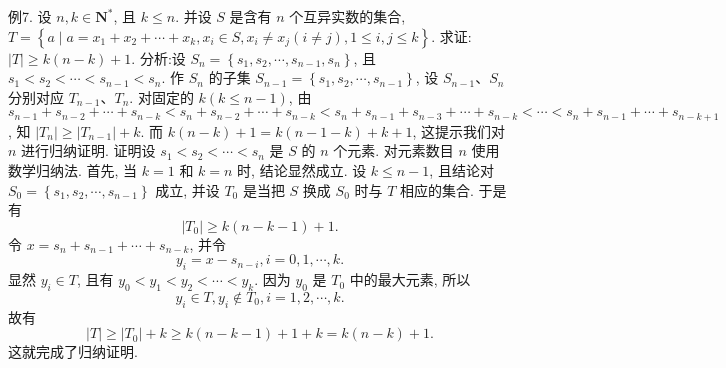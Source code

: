 例7. 设 $n, k \in \mathbf{N}^*$, 且 $k \leqslant n$. 并设 $S$ 是含有 $n$ 个互异实数的集合, $T=\left\{a \mid a=x_1+x_2+\cdots+x_k, x_i \in S, x_i \neq x_j(i \neq j), 1 \leqslant i, j \leqslant k\right\}$. 求证: $|T| \geqslant k(n-k)+1$.
分析:设 $S_n=\left\{s_1, s_2, \cdots, s_{n-1}, s_n\right\}$, 且 $s_1<s_2<\cdots<s_{n-1}<s_n$. 作 $S_n$ 的子集 $S_{n-1}=\left\{s_1, s_2, \cdots, s_{n-1}\right\}$, 设 $S_{n-1} 、 S_n$ 分别对应 $T_{n-1} 、 T_n$. 对固定的 $k (k \leqslant n-1)$, 由 $s_{n-1}+s_{n-2}+\cdots+s_{n-k}<s_n+s_{n-2}+\cdots+s_{n-k}<s_n+s_{n-1}+s_{n-3}+\cdots+s_{n-k}<\cdots<s_n+s_{n-1}+\cdots+s_{n-k+1}$, 知 $\left|T_n\right| \geqslant\left|T_{n-1}\right|+k$. 而 $k(n-k)+ 1=k(n-1-k)+k+1$, 这提示我们对 $n$ 进行归纳证明.
证明设 $s_1<s_2<\cdots<s_n$ 是 $S$ 的 $n$ 个元素.
对元素数目 $n$ 使用数学归纳法.
首先, 当 $k=1$ 和 $k=n$ 时, 结论显然成立.
设 $k \leqslant n-1$, 且结论对 $S_0=\left\{s_1, s_2, \cdots, s_{n-1}\right\}$ 成立, 并设 $T_0$ 是当把 $S$ 换成 $S_0$ 时与 $T$ 相应的集合.
于是有
$$
\left|T_0\right| \geqslant k(n-k-1)+1 .
$$
令 $x=s_n+s_{n-1}+\cdots+s_{n-k}$, 并令
$$
y_i=x-s_{n-i}, i=0,1, \cdots, k .
$$
显然 $y_i \in T$, 且有 $y_0<y_1<y_2<\cdots<y_k$. 因为 $y_0$ 是 $T_0$ 中的最大元素, 所以
$$
y_i \in T, y_i \notin T_0, i=1,2, \cdots, k .
$$
故有
$$
|T| \geqslant\left|T_0\right|+k \geqslant k(n-k-1)+1+k=k(n-k)+1 .
$$
这就完成了归纳证明.




